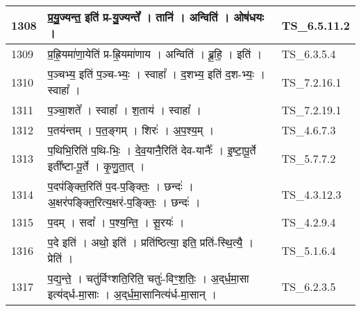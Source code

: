 \documentclass[17pt]{extarticle}
\begin{document}
\begin{longtable}{||p{0.4in}||p{4.9in}||p{0.9in}||}
    \hline
        
    1308 & प्र॒यु॒ज्यन्त॒ इति॑ प्र{-}यु॒ज्यन्ते᳚   ।   तानि॑   ।   अन्विति॑   ।   ओष॑धयः   ।    & TS\_6.5.11.2       \\
    
    \hline
        
    1309 & प्र॒ह्रि॒यमा॑णा॒येति॑ प्र{-}ह्रि॒यमा॑णाय   ।   अन्विति॑   ।   ब्रू॒हि॒   ।   इति॑   ।    & TS\_6.3.5.4       \\
    
    \hline
        
    1310 & प॒ञ्चभ्य॒ इति॑ प॒ञ्च{-}भ्यः॒   ।   स्वाहा᳚   ।   द॒शभ्य॒ इति॑ द॒श{-}भ्यः॒   ।   स्वाहा᳚   ।    & TS\_7.2.16.1       \\
    
    \hline
        
    1311 & प॒ञ्चा॒शते᳚   ।   स्वाहा᳚   ।   श॒ताय॑   ।   स्वाहा᳚   ।    & TS\_7.2.19.1       \\
    
    \hline
        
    1312 & प॒तय॑न्तम्   ।   प॒त॒ङ्गम्   ।   शिरः॑   ।   अ॒प॒श्य॒म्   ।    & TS\_4.6.7.3       \\
    
    \hline
        
    1313 & प॒थिभि॒रिति॑ प॒थि{-}भिः॒   ।   दे॒व॒यानै॒रिति॑ देव{-}यानैः᳚   ।   इ॒ष्टा॒पू॒र्ते इती᳚ष्टा{-}पू॒र्ते   ।   कृ॒णु॒ता॒त्   ।    & TS\_5.7.7.2       \\
    
    \hline
        
    1314 & प॒दप॑ङ्क्ति॒रिति॑ प॒द{-}प॒ङ्क्तिः॒   ।   छन्दः॑   ।   अ॒क्षर॑पङ्क्ति॒रित्य॒क्षर॑{-}प॒ङ्क्तिः॒   ।   छन्दः॑   ।    & TS\_4.3.12.3       \\
    
    \hline
        
    1315 & प॒दम्   ।   सदा᳚   ।   प॒श्य॒न्ति॒   ।   सू॒रयः॑   ।    & TS\_4.2.9.4       \\
    
    \hline
        
    1316 & प॒दे इति॑   ।   अथो॒ इति॑   ।   प्रति॑ष्ठित्या॒ इति॒ प्रति॑{-}स्थि॒त्यै॒   ।   प्रेति॑   ।    & TS\_5.1.6.4       \\
    
    \hline
        
    1317 & प॒द्य॒न्ते॒   ।   चतु॑र्विꣳशति॒रिति॒ चतुः॑{-}विꣳ॒॒श॒तिः॒   ।   अ॒द्‌र्ध॒मा॒सा इत्य॑द्‌र्ध{-}मा॒साः   ।   अ॒द्‌र्ध॒मा॒सानित्य॑र्ध{-}मा॒सान्   ।    & TS\_6.2.3.5       \\
    

\end{longtable}
\end{document}

